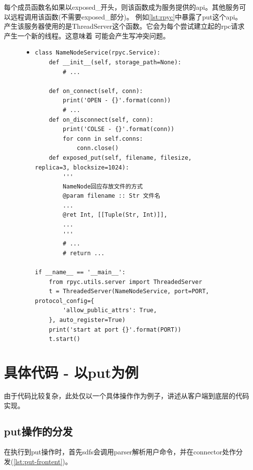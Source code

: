 \documentclass[a4paper]{article}
\begin{document}
每个成员函数名如果以exposed\_开头，则该函数成为服务提供的api。其他服务可以远程调用该函数(不需要exposed\_部分)。
例如\autoref{lst:rpyc}中暴露了put这个api。\\

产生该服务器使用的是ThreadServer这个函数。它会为每个尝试建立起的rpc请求产生一个新的线程。这意味着
可能会产生写冲突问题。
\begin{figure}[!hbt]
\begin{itemize}
\item[] \begin{lstlisting}[style=mypython, label=lst:rpyc, caption=rpyc库简介]
class NameNodeService(rpyc.Service):
    def __init__(self, storage_path=None):
        # ...

    def on_connect(self, conn):
        print('OPEN - {}'.format(conn))
        # ...
    def on_disconnect(self, conn):
        print('COLSE - {}'.format(conn))
        for conn in self.conns:
            conn.close()
    def exposed_put(self, filename, filesize, replica=3, blocksize=1024):
        '''
        NameNode回应存放文件的方式
        @param filename :: Str 文件名
        ...
        @ret Int, [[Tuple(Str, Int)]], 
        ...
        '''
        # ...
        # return ...

if __name__ == '__main__':
    from rpyc.utils.server import ThreadedServer
    t = ThreadedServer(NameNodeService, port=PORT, protocol_config={
        'allow_public_attrs': True,
    }, auto_register=True)
    print('start at port {}'.format(PORT))
    t.start()
\end{lstlisting}
\end{itemize}
\end{figure}

\section{具体代码 - 以put为例}
由于代码比较复杂，此处仅以一个具体操作作为例子，讲述从客户端到底层的代码实现。
\subsection{put操作的分发}
在执行到put操作时，首先sdfs会调用parser解析用户命令，并在connector处作分发(\autoref{lst:put-frontent})。\\
\end{document}
